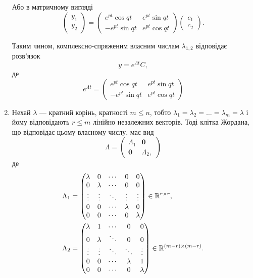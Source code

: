 \begin{enumerate}
Або в матричному вигляді
\begin{equation*}
	\begin{pmatrix} y_1 \\ y_2 \end{pmatrix} =
	\begin{pmatrix}
		e^{pt} \cos qt & e^{pt} \sin qt \\
		- e^{pt} \sin qt & e^{pt} \cos qt
	\end{pmatrix}
	\begin{pmatrix} c_1 \\ c_2 \end{pmatrix}.
\end{equation*}

Таким чином, комплексно-спряженим власним числам $\lambda_{1,2}$ відповідає розв’язок  
\begin{equation*}
	y = e^{\Lambda t} C,
\end{equation*}
де
\begin{equation*}
	e^{\Lambda t} =
	\begin{pmatrix}
		e^{pt} \cos qt & e^{pt} \sin qt \\
		- e^{pt} \sin qt & e^{pt} \cos qt
	\end{pmatrix} 
\end{equation*}

\item Нехай $\lambda$ --- кратний корінь, кратності $m \le n$, тобто $\lambda_1 = \lambda_2 = \ldots = \lambda_m = \lambda$ і йому відповідають $r \le m$ лінійно незалежних векторів. Тоді клітка Жордана, що відповідає цьому власному числу, має вид
\begin{equation*}
	\Lambda = 
	\begin{pmatrix}
		\Lambda_1 & \textbf{0} \\
		\textbf{0} & \Lambda_2, 
	\end{pmatrix}
\end{equation*}
де
\begin{align*}
	\Lambda_1 &= 
	\begin{pmatrix} 
		\lambda & 0 & \cdots & 0 & 0 \\
		0 & \lambda & \cdots & 0 & 0 \\
		\vdots & \vdots & \ddots & \vdots & \vdots \\
		0 & 0 & \cdots & \lambda & 0 \\
		0 & 0 & \cdots & 0 & \lambda
	\end{pmatrix} \in \mathbb{R}^{r \times r}, \\
	\Lambda_2 &= 
	\begin{pmatrix} 
		\lambda & 1 & \cdots & 0 & 0 \\
		0 & \lambda & \ddots & 0 & 0 \\
		\vdots & \vdots & \ddots & \ddots & \vdots \\
		0 & 0 & \cdots & \lambda & 1 \\
		0 & 0 & \cdots & 0 & \lambda
	\end{pmatrix} \in \mathbb{R}^{(m - r) \times (m - r)}.
\end{align*}
 

\end{enumerate}
